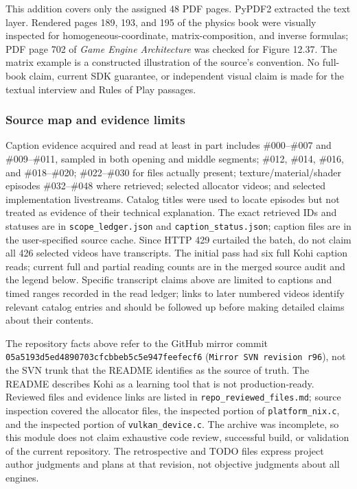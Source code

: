 This addition covers only the assigned 48 PDF pages. PyPDF2 extracted the text layer. Rendered pages 189, 193, and 195 of the physics book were visually inspected for homogeneous-coordinate, matrix-composition, and inverse formulas; PDF page 702 of \emph{Game Engine Architecture} was checked for Figure 12.37. The matrix example is a constructed illustration of the source's convention. No full-book claim, current SDK guarantee, or independent visual claim is made for the textual interview and Rules of Play passages.

\subsubsection{Source map and evidence limits}\label{source-map-and-evidence-limits}

Caption evidence acquired and read at least in part includes \#000--\#007 and \#009--\#011, sampled in both opening and middle segments; \#012, \#014, \#016, and \#018--\#020; \#022--\#030 for files actually present; texture/material/shader episodes \#032--\#048 where retrieved; selected allocator videos; and selected implementation livestreams. Catalog titles were used to locate episodes but not treated as evidence of their technical explanation. The exact retrieved IDs and statuses are in \texttt{scope\_ledger.json} and \texttt{caption\_status.json}; caption files are in the user-specified source cache. Since HTTP 429 curtailed the batch, do not claim all 426 selected videos have transcripts. The initial pass had six full Kohi caption reads; current full and partial reading counts are in the merged source audit and the legend below. Specific transcript claims above are limited to captions and timed ranges recorded in the read ledger; links to later numbered videos identify relevant catalog entries and should be followed up before making detailed claims about their contents.

The repository facts above refer to the GitHub mirror commit \texttt{05a5193d5ed4890703cfcbbeb5c5e947feefecf6} (\texttt{Mirror\ SVN\ revision\ r96}), not the SVN trunk that the README identifies as the source of truth. The README describes Kohi as a learning tool that is not production-ready. Reviewed files and evidence links are listed in \texttt{repo\_reviewed\_files.md}; source inspection covered the allocator files, the inspected portion of \texttt{platform\_nix.c}, and the inspected portion of \texttt{vulkan\_device.c}. The archive was incomplete, so this module does not claim exhaustive code review, successful build, or validation of the current repository. The retrospective and TODO files express project author judgments and plans at that revision, not objective judgments about all engines.

